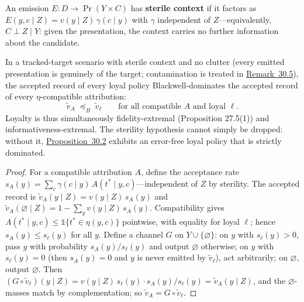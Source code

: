 
\begin{thmdef}

An emission \(E : D \to \Pr(Y \times C)\) has \textbf{sterile context} if it factors as \(E(y, c \mid Z) = v(y \mid Z)\, \gamma(c \mid y)\) with \(\gamma\) independent of \(Z\)---\hspace{0pt}equivalently, \(C \perp Z \mid Y\): given the presentation, the context carries no further information about the candidate.
\end{thmdef}

\begin{thmplain}

In a tracked-target scenario with sterile context and no clutter (every emitted presentation is genuinely of the target; contamination is treated in \hyperlink{stmt:30.5}{Remark~30.5}), the accepted record of every loyal policy Blackwell-dominates the accepted record of every \(\eta\)-compatible attribution:
\[
\tilde v_{A} \;\preceq_B\; \tilde v_{\ell}
\qquad \text{for all compatible } A \text{ and loyal } \ell .
\]
Loyalty is thus simultaneously fidelity-extremal (Proposition 27.5(1)) and informativeness-extremal. The sterility hypothesis cannot simply be dropped: without it, \hyperlink{stmt:30.2}{Proposition~30.2} exhibits an error-free loyal policy that is strictly dominated.
\end{thmplain}

\begin{proof}

For a compatible attribution \(A\), define the acceptance rate \(s_A(y) = \sum_c \gamma(c \mid y)\, A(t^* \mid y, c)\)---\hspace{0pt}independent of \(Z\) by sterility. The accepted record is \(\tilde v_A(y \mid Z) = v(y \mid Z)\, s_A(y)\) and \(\tilde v_A(\varnothing \mid Z) = 1 - \sum_y v(y \mid Z)\, s_A(y)\). Compatibility gives \(A(t^* \mid y, c) \le \mathbb{1}\{t^* \in \eta(y,c)\}\) pointwise, with equality for loyal \(\ell\); hence \(s_A(y) \le s_\ell(y)\) for all \(y\). Define a channel \(G\) on \(Y \cup \{\varnothing\}\): on \(y\) with \(s_\ell(y) > 0\), pass \(y\) with probability \(s_A(y)/s_\ell(y)\) and output \(\varnothing\) otherwise; on \(y\) with \(s_\ell(y) = 0\) (then \(s_A(y) = 0\) and \(y\) is never emitted by \(\tilde v_\ell\)), act arbitrarily; on \(\varnothing\), output \(\varnothing\). Then \((G \circ \tilde v_\ell)(y \mid Z) = v(y \mid Z)\, s_\ell(y) \cdot s_A(y)/s_\ell(y) = \tilde v_A(y \mid Z)\), and the \(\varnothing\)-masses match by complementation; so \(\tilde v_A = G \circ \tilde v_\ell\).
\end{proof}

